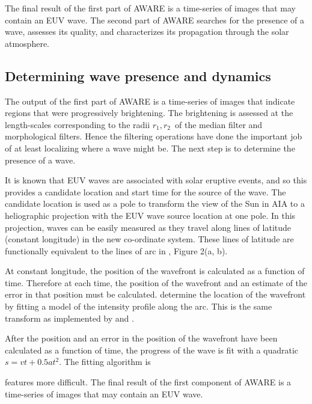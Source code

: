 The final result of the first part of AWARE is a time-series of images
that may contain an EUV wave.  The second part of AWARE searches for
the presence of a wave, assesses its quality, and characterizes its
propagation through the solar atmosphere.

\subsection{Determining wave presence and
  dynamics}\label{sec:aware:dynamics}

The output of the first part of AWARE is a time-series of images that
indicate regions that were progressively brightening.  The brightening
is assessed at the length-scales corresponding to the radii $r_{1},
r_{2}$\textellipsis\ of the median filter and morphological filters.
Hence the filtering operations have done the important job of at least
localizing where a wave might be.  The next step is to determine the
presence of a wave.

It is known that EUV waves are associated with solar eruptive events,
and so this provides a candidate location and start time for the
source of the wave. The candidate location is used as a pole to
transform the view of the Sun in AIA to a heliographic projection with
the EUV wave source location at one pole.  In this projection, waves
can be easily measured as they travel along lines of latitude
(constant longitude) in the new co-ordinate system.  These lines of
latitude are functionally equivalent to the lines of arc in
\citet{2014SoPh..289.3279L}, Figure 2(a, b).

At constant longitude, the position of the wavefront is calculated as
a function of time.  Therefore at each time, the position of the
wavefront and an estimate of the error in that position must be
calculated. \citet{2014SoPh..289.3279L} determine the location of the
wavefront by fitting a model of the intensity profile along the arc.
This is the same transform as implemented by
\citet{2014SoPh..289.3279L} and \citet{2005SoPh..228..265P}. 

%
%

After the position and an error in the position of the wavefront have
been calculated as a function of time, the progress of the wave is fit
with a quadratic $s = vt + 0.5at^{2}$.  The fitting algorithm is 


features more difficult. The final result of the first component of
AWARE is a time-series of images that may contain an EUV wave.

